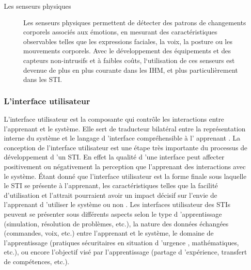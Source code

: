 \begin{description}
    \item[Les senseurs physiques] Les senseurs physiques permettent de détecter des patrons de changements corporels associés aux émotions, en mesurant des caractéristiques observables telles que les expressions faciales, la voix, la posture ou les mouvements corporels. Avec le développement des équipements et des capteurs non-intrusifs et à faibles coûts, l‘utilisation de ces senseurs est devenue de plus en plus courante dans les IHM, et plus particulièrement dans les STI.

    
\end{description}
 
\subsubsection{L'interface utilisateur}
L'interface utilisateur est la composante qui contrôle les interactions entre l'apprenant et le système. Elle sert de traducteur bilatéral entre la représentation interne du système et le langage d 'interface compréhensible à l' apprenant \cite{nwana}. La conception de l'interface utilisateur est une étape très importante du processus de développement d 'un STI. En effet la qualité d 'une interface peut affecter positivement ou négativement la perception que l'apprenant des interactions avec le système.  Étant donné que l'interface utilisateur est la forme finale sous laquelle le STI se présente à l'apprenant, les caractéristiques telles que la facilité d'utilisation et l'attrait pourraient avoir un impact décisif sur l'envie de l'apprenant d 'utiliser le système ou non \cite{nwana} .  Les interfaces utilisateur des STIs peuvent se présenter sous différents aspects selon le type d 'apprentissage (simulation, résolution de problèmes, etc.), la nature des données échangées (commandes, voix, etc.) entre l'apprenant et le système, le domaine de l'apprentissage (pratiques sécuritaires en situation d 'urgence , mathématiques, etc.), ou encore l'objectif visé par l'apprentissage (partage d 'expérience, transfert de compétences, etc.). 


